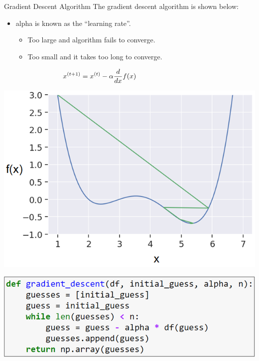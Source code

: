\documentclass[aspectratio=169]{../latex_main/tntbeamer}  %
\begin{document}
	
	
	\begin{frame}{Gradient Descent Algorithm}
	    The gradient descent algorithm is shown below:
	    \begin{itemize}
	        \item alpha is known as the “learning rate”.
	        \begin{itemize}
	            \item Too large and algorithm fails to converge.
	            \item Too small and it takes too long to converge.
	        \end{itemize}
	    \end{itemize}
	    \begin{equation*}
	        \hspace{-3cm}x^{(t+1)} = x^{(t)} - \alpha\frac{d}{dx}f(x)
 	    \end{equation*}
 	    
 	    
 	    \vspace{-3cm}
 	    \hspace{8.5cm} \includegraphics[scale=.35]{Bild4}\\
 	    \vspace{3cm}
 	    
 	    
 	    \vspace{-4cm}
 	    \hspace{0cm} \includegraphics[scale=.5]{Bild3}\\
 	    \vspace{4cm}
	\end{frame}
	
\end{document}
